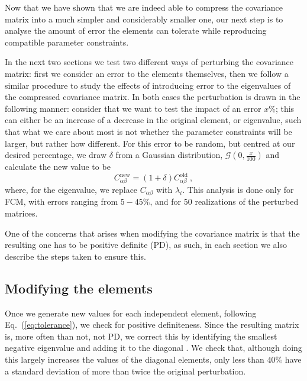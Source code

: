 \documentclass[twocolumn]{\docclass}
\newcommand{\ec}[1]{Eq.~(\ref{eq:#1})}
\newcommand\be{\begin{equation}}
\newcommand\ee{\end{equation}}
\newcommand\full{FCM}
\begin{document}
	Now that we have shown that we are indeed able to compress the covariance matrix into a much simpler and considerably smaller one, our next step is to analyse the amount of error the elements can tolerate while reproducing compatible parameter constraints. 
	
	In the next two sections we test two different ways of perturbing the covariance matrix: first we consider an error to the elements themselves, then we follow a similar procedure to study the effects of introducing error to the eigenvalues of the compressed covariance matrix. In both cases the perturbation is drawn in the following manner: consider that we want to test the impact of an error $x \%$; this can either be an increase of a decrease in the original element, or eigenvalue, such that what we care about most is not whether the parameter constraints will be larger, but rather how different. For this error to be random, but centred at our desired percentage, we draw $\delta$ from a Gaussian distribution, $\mathcal{G}(0,\frac{x}{100})$ and calculate the new value to be
	\be \label{eq:tolerance}
	C_{\alpha \beta}^{\mathrm{new}} = (1 + \delta)C_{\alpha \beta}^{\mathrm{old}}\ 
	,\ee
	where, for the eigenvalue, we replace $C_{\alpha \beta}$ with $\lambda_i$. This analysis is done only for \full, with errors ranging from $5 - 45 \%$, and for 50 realizations of the perturbed matrices.
	
	One of the concerns that arises when modifying the covariance matrix is that the resulting one has to be positive definite (PD), as such, in each section we also describe the steps taken to ensure this.
	
	
	\subsection{Modifying the elements}
	
	Once we generate new values for each independent element, following \ec{tolerance}, we check for positive definiteness. Since the resulting matrix is, more often than not, not PD, we correct this by identifying the smallest negative eigenvalue and adding it to the diagonal \cite{Yuan:2008}. We check that, although doing this largely increases the values of the diagonal elements, only less than $40 \%$ have a standard deviation of more than twice the original perturbation. 
	
\end{document}

